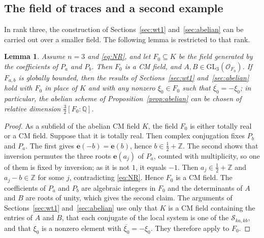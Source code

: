 \documentclass[11pt]{amsart}
\newtheorem{lemma}[theorem]{Lemma}
\theoremstyle{definition}
\theoremstyle{remark}
\numberwithin{equation}{section}
\newcommand{\Q}{\mathbb{Q}}
\newcommand{\Z}{\mathbb{Z}}
\newcommand{\e}{\mathbf{e}}
\newcommand{\cS}{\mathcal{S}}
\newcommand{\cO}{\mathcal{O}}
\newcommand{\Fab}{F_{a,b}}
\begin{document}
\subsection{The field of traces and a second example}
In rank three, the construction of Sections~\ref{sec:wt1} and~\ref{sec:abelian} can be carried out over a smaller field. The following lemma is restricted to that rank.

\begin{lemma}\label{lem:F0}
Assume $n=3$ and \eqref{eq:NR}, and let $F_0\subseteq K$ be the field generated by the coefficients of $P_a$ and $P_b$. Then $F_0$ is a CM field, and $A,B\in\mathrm{GL}_3(\cO_{F_0})$. If $\Fab$ is globally bounded, then the results of Sections~\ref{sec:wt1} and~\ref{sec:abelian} hold with $F_0$ in place of $K$ and with any nonzero $\xi_0\in F_0$ such that $\overline{\xi_0}=-\xi_0$; in particular, the abelian scheme of Proposition~\ref{prop:abelian} can be chosen of relative dimension $\frac32[F_0:\Q]$.
\end{lemma}

\begin{proof}
As a subfield of the abelian CM field $K$, the field $F_0$ is either totally real or a CM field. Suppose that it is totally real. Then complex conjugation fixes $P_b$ and $P_a$. The first gives $\e(-b)=\e(b)$, hence $b\in\frac12+\Z$. The second shows that inversion permutes the three roots $\e(a_j)$ of $P_a$, counted with multiplicity, so one of them is fixed by inversion; as it is not $1$, it equals $-1$. Then $a_j\in\frac12+\Z$ and $a_j-b\in\Z$ for some $j$, contradicting \eqref{eq:NR}. Hence $F_0$ is a CM field. The coefficients of $P_a$ and $P_b$ are algebraic integers in $F_0$ and the determinants of $A$ and $B$ are roots of unity, which gives the second claim. The arguments of Sections~\ref{sec:wt1} and~\ref{sec:abelian} use only that $K$ is a CM field containing the entries of $A$ and $B$, that each conjugate of the local system is one of the $\cS_{ka,kb}$, and that $\xi_0$ is a nonzero element with $\overline{\xi_0}=-\xi_0$. They therefore apply to $F_0$.
\end{proof}
\end{document}
